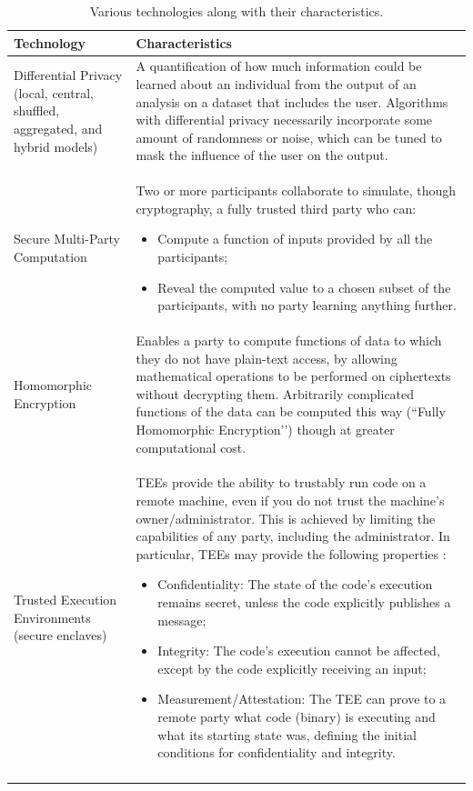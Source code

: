 \documentclass[11pt]{article}
\begin{document}
\begin{table}
\renewcommand{\arraystretch}{1.2}
\begin{center} 
\begin{tabular}{@{}p{2in} p{4in}@{}}
 \toprule 
\textbf{Technology} & \textbf{Characteristics} \\
\midrule
\addlinespace[0.05in]
Differential Privacy (local, central, shuffled, aggregated, and hybrid models) & A quantification of how much information could be learned about an individual from the output of an analysis on a dataset that includes the user. Algorithms with differential privacy necessarily incorporate some amount of randomness or noise, which can be tuned to mask the influence of the user on the output. 
\\
\addlinespace[0.1in]
Secure Multi-Party Computation & Two or more participants collaborate to simulate, though cryptography, a fully trusted third party who can:
\begin{itemize} 
\item  Compute a function of inputs provided by all the participants;
\item Reveal the computed value to a chosen subset of the participants, with no party learning anything further.
\end{itemize}
\\
\addlinespace[0.1in]
Homomorphic Encryption & Enables a party to compute functions of data to which they do not have plain-text access, by allowing mathematical operations to be performed on ciphertexts without decrypting them.  Arbitrarily complicated functions of the data can be computed this way (``Fully Homomorphic Encryption’’) though at greater computational cost. 
\\
\addlinespace[0.1in]
Trusted Execution Environments (secure enclaves) & TEEs provide the ability to trustably run code on a remote machine, even if you do not trust the machine's owner/administrator.  This is achieved by limiting the capabilities of any party, including the administrator.  In particular, TEEs may provide the following properties \cite{subramanyan2017formal}:
\begin{itemize}
\item Confidentiality: The state of the code's execution remains secret, unless the code explicitly publishes a message;
\item Integrity: The code's execution cannot be affected, except by the code explicitly receiving an input;
\item Measurement/Attestation: The TEE can prove to a remote party what code (binary) is executing and what its starting state was, defining the initial conditions for confidentiality and integrity.
\end{itemize}
\\
\addlinespace[0.05in] 
\bottomrule
\end{tabular} 
\end{center}
\caption{Various technologies along with their characteristics.} 
\label{table:technologies}
\end{table}
\end{document}
